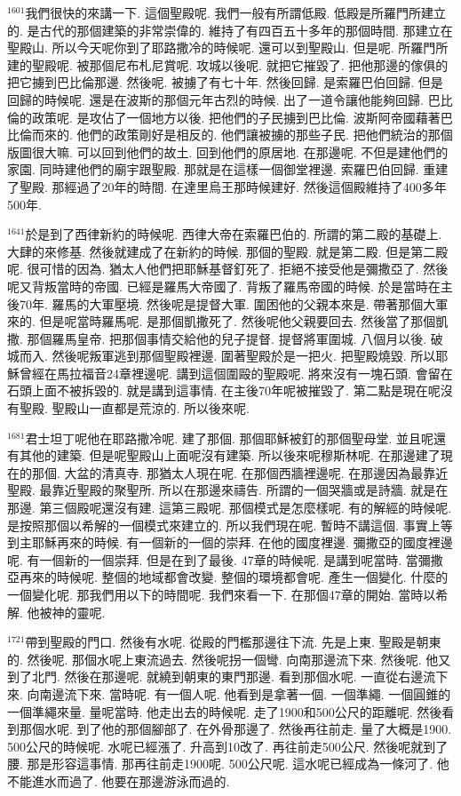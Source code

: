 \documentclass{book}
\begin{document}
$^{1601}$我們很快的來講一下.
這個聖殿呢.
我們一般有所謂低殿.
低殿是所羅門所建立的.
是古代的那個建築的非常崇偉的.
維持了有四百五十多年的那個時間.
那建立在聖殿山.
所以今天呢你到了耶路撒冷的時候呢.
還可以到聖殿山.
但是呢.
所羅門所建的聖殿呢.
被那個尼布札尼賞呢.
攻城以後呢.
就把它摧毀了.
把他那邊的傢俱的把它擄到巴比倫那邊.
然後呢.
被擄了有七十年.
然後回歸.
是索羅巴伯回歸.
但是回歸的時候呢.
還是在波斯的那個元年古烈的時候.
出了一道令讓他能夠回歸.
巴比倫的政策呢.
是攻佔了一個地方以後.
把他們的子民擄到巴比倫.
波斯阿帝國藉著巴比倫而來的.
他們的政策剛好是相反的.
他們讓被擄的那些子民.
把他們統治的那個版圖很大嘛.
可以回到他們的故土.
回到他們的原居地.
在那邊呢.
不但是建他們的家園.
同時建他們的廟宇跟聖殿.
那就是在這樣一個御堂裡邊.
索羅巴伯回歸.
重建了聖殿.
那經過了20年的時間.
在達里烏王那時候建好.
然後這個殿維持了400多年500年.

$^{1641}$於是到了西律新約的時候呢.
西律大帝在索羅巴伯的.
所謂的第二殿的基礎上.
大肆的來修基.
然後就建成了在新約的時候.
那個的聖殿.
就是第二殿.
但是第二殿呢.
很可惜的因為.
猶太人他們把耶穌基督釘死了.
拒絕不接受他是彌撒亞了.
然後呢又背叛當時的帝國.
已經是羅馬大帝國了.
背叛了羅馬帝國的時候.
於是當時在主後70年.
羅馬的大軍壓境.
然後呢是提督大軍.
圍困他的父親本來是.
帶著那個大軍來的.
但是呢當時羅馬呢.
是那個凱撒死了.
然後呢他父親要回去.
然後當了那個凱撒.
那個羅馬皇帝.
把那個事情交給他的兒子提督.
提督將軍圍城.
八個月以後.
破城而入.
然後呢叛軍逃到那個聖殿裡邊.
圍著聖殿於是一把火.
把聖殿燒毀.
所以耶穌曾經在馬拉福音24章裡邊呢.
講到這個圍毆的聖殿呢.
將來沒有一塊石頭.
會留在石頭上面不被拆毀的.
就是講到這事情.
在主後70年呢被摧毀了.
第二點是現在呢沒有聖殿.
聖殿山一直都是荒涼的.
所以後來呢.

$^{1681}$君士坦丁呢他在耶路撒冷呢.
建了那個.
那個耶穌被釘的那個聖母堂.
並且呢還有其他的建築.
但是呢聖殿山上面呢沒有建築.
所以後來呢穆斯林呢.
在那邊建了現在的那個.
大盆的清真寺.
那猶太人現在呢.
在那個西牆裡邊呢.
在那邊因為最靠近聖殿.
最靠近聖殿的聚聖所.
所以在那邊來禱告.
所謂的一個哭牆或是詩牆.
就是在那邊.
第三個殿呢還沒有建.
這第三殿呢.
那個模式是怎麼樣呢.
有的解經的時候呢.
是按照那個以希解的一個模式來建立的.
所以我們現在呢.
暫時不講這個.
事實上等到主耶穌再來的時候.
有一個新的一個的崇拜.
在他的國度裡邊.
彌撒亞的國度裡邊呢.
有一個新的一個崇拜.
但是在到了最後.
47章的時候呢.
是講到呢當時.
當彌撒亞再來的時候呢.
整個的地域都會改變.
整個的環境都會呢.
產生一個變化.
什麼的一個變化呢.
那我們用以下的時間呢.
我們來看一下.
在那個47章的開始.
當時以希解.
他被神的靈呢.

$^{1721}$帶到聖殿的門口.
然後有水呢.
從殿的門檻那邊往下流.
先是上東.
聖殿是朝東的.
然後呢.
那個水呢上東流過去.
然後呢拐一個彎.
向南那邊流下來.
然後呢.
他又到了北門.
然後在那邊呢.
就繞到朝東的東門那邊.
看到那個水呢.
一直從右邊流下來.
向南邊流下來.
當時呢.
有一個人呢.
他看到是拿著一個.
一個準繩.
一個圓錐的一個準繩來量.
量呢當時.
他走出去的時候呢.
走了1900和500公尺的距離呢.
然後看到那個水呢.
到了他的那個腳部了.
在外骨那邊了.
然後再往前走.
量了大概是1900.
500公尺的時候呢.
水呢已經漲了.
升高到10改了.
再往前走500公尺.
然後呢就到了腰.
那是形容這事情.
那再往前走1900呢.
500公尺呢.
這水呢已經成為一條河了.
他不能進水而過了.
他要在那邊游泳而過的.
\end{document}
